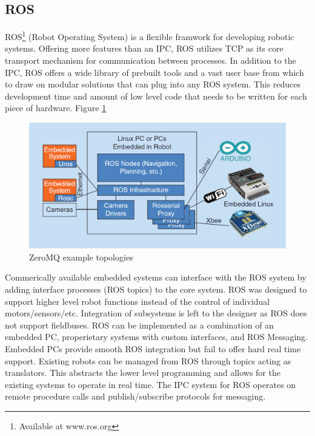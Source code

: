 \subsection{ROS}

ROS\footnote{Available at www.ros.org} (Robot Operating System) is a flexible framwork for developing robotic systems. Offering more features than an IPC, ROS utilizes TCP as its core transport mechanism for communication between processes. In addition to the IPC, ROS offers a wide library of prebuilt tools and a vast user base from which to draw on modular solutions that can plug into any ROS system. This reduces development time and amount of low level code that needs to be written for each piece of hardware. Figure \ref{fig:ROS Network Diagram}

\begin{figure}[thpb]
 \centering
 \includegraphics[width=1.0\columnwidth]{./images/rosnet.png}
  \caption{ZeroMQ example topologies}
  \label{fig:ROS Network Diagram}
\end{figure} 

Commerically available embedded systems can interface with the ROS system by adding interface processes (ROS topics) to the core system. ROS was designed to support higher level robot functions instead of the control of individual motors/sensors/etc. Integration of subsystems is left to the designer as ROS does not support fieldbuses\cite{EMBEDDEDROS}. ROS can be implemented as a combination of an embedded PC, properietary systems with custom interfaces, and ROS Messaging. Embedded PCs provide smooth ROS integration but fail to offer hard real time support. Existing robots can be managed from ROS through topics acting as translators. This abstracts the lower level programming and allows for the existing systems to operate in real time. The IPC system for ROS operates on remote procedure calls and publish/subscribe protocols for messaging. 

